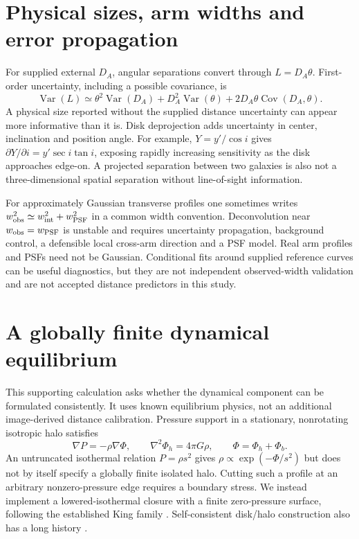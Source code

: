 \documentclass[10pt]{article}
\begin{document}
\section{Physical sizes, arm widths and error propagation}
For supplied external $D_A$, angular separations convert through
$L=D_A\theta$. First-order uncertainty, including a possible covariance, is
\begin{equation}
 \operatorname{Var}(L)\simeq\theta^2\operatorname{Var}(D_A)
 +D_A^2\operatorname{Var}(\theta)
 +2D_A\theta\operatorname{Cov}(D_A,\theta).
\end{equation}
A physical size reported without the supplied distance uncertainty can appear
more informative than it is. Disk deprojection adds uncertainty in center,
inclination and position angle. For example, $Y=y'/\cos i$ gives
$\partial Y/\partial i=y'\sec i\tan i$, exposing rapidly increasing
sensitivity as the disk approaches edge-on. A projected separation between
two galaxies is also not a three-dimensional spatial separation without
line-of-sight information.

For approximately Gaussian transverse profiles one sometimes writes
$w_{\rm obs}^2\simeq w_{\rm int}^2+w_{\rm PSF}^2$ in a common width
convention. Deconvolution near $w_{\rm obs}=w_{\rm PSF}$ is unstable and
requires uncertainty propagation, background control, a defensible local
cross-arm direction and a PSF model. Real arm profiles and PSFs need not be
Gaussian. Conditional fits around supplied reference curves can be useful
diagnostics, but they are not independent observed-width validation and are
not accepted distance predictors in this study.

\section{A globally finite dynamical equilibrium}
\label{sec:finite}
This supporting calculation asks whether the dynamical component can be
formulated consistently. It uses known equilibrium physics, not an additional
image-derived distance calibration. Pressure support in a stationary,
nonrotating isotropic halo satisfies
\begin{equation}
 \nabla P=-\rho\nabla\Phi,\qquad
 \nabla^2\Phi_h=4\pi G\rho,\qquad
 \Phi=\Phi_h+\Phi_b.
 \label{eq:hydro}
\end{equation}
An untruncated isothermal relation $P=\rho s^2$ gives
$\rho\propto\exp(-\Phi/s^2)$ but does not by itself specify a globally finite
isolated halo. Cutting such a profile at an arbitrary nonzero-pressure edge
requires a boundary stress. We instead implement a lowered-isothermal
closure with a finite zero-pressure surface, following the established
King family \citep{king1966,gieles2015}. Self-consistent disk/halo construction
also has a long history \citep{kuijken1995}.
\end{document}
